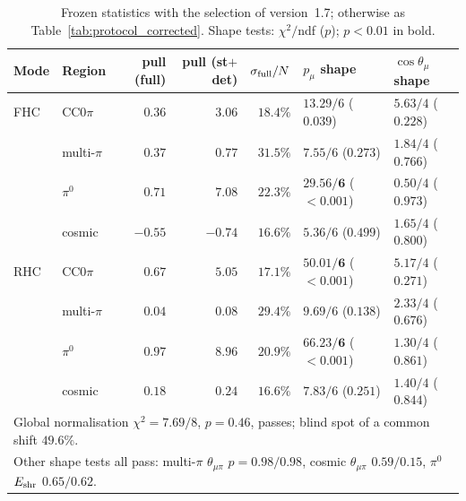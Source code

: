 \documentclass[11pt,a4paper]{article}
\begin{document}
\begin{table}[H]
  \centering
  \caption{Frozen statistics with the selection of version~1.7; otherwise as Table~\ref{tab:protocol_corrected}. Shape
    tests: $\chi^2/$ndf ($p$); $p<0.01$ in bold.}
  \label{tab:protocol_braggfix}
  \small
  \begin{tabular}{llrrr|ll}
    \toprule
    Mode & Region & pull (full) & pull (st$+$det) & $\sigma_{\rm full}/N$ & $p_\mu$ shape & $\cos\theta_\mu$ shape \\
    \midrule
    FHC & CC$0\pi$    & $0.36$ & $3.06$ & $18.4\%$ & $13.29/6$ ($0.039$) & $5.63/4$ ($0.228$) \\
        & multi-$\pi$ & $0.37$ & $0.77$ & $31.5\%$ & $7.55/6$ ($0.273$) & $1.84/4$ ($0.766$) \\
        & $\pi^0$     & $0.71$ & $7.08$ & $22.3\%$ & $\mathbf{29.56/6}$ ($\mathbf{<0.001}$) & $0.50/4$ ($0.973$) \\
        & cosmic      & $-0.55$ & $-0.74$ & $16.6\%$ & $5.36/6$ ($0.499$) & $1.65/4$ ($0.800$) \\
    \midrule
    RHC & CC$0\pi$    & $0.67$ & $5.05$ & $17.1\%$ & $\mathbf{50.01/6}$ ($\mathbf{<0.001}$) & $5.17/4$ ($0.271$) \\
        & multi-$\pi$ & $0.04$ & $0.08$ & $29.4\%$ & $9.69/6$ ($0.138$) & $2.33/4$ ($0.676$) \\
        & $\pi^0$     & $0.97$ & $8.96$ & $20.9\%$ & $\mathbf{66.23/6}$ ($\mathbf{<0.001}$) & $1.30/4$ ($0.861$) \\
        & cosmic      & $0.18$ & $0.24$ & $16.6\%$ & $7.83/6$ ($0.251$) & $1.40/4$ ($0.844$) \\
    \midrule
    \multicolumn{7}{l}{Global normalisation $\chi^2 = 7.69/8$, $p=0.46$, passes; blind spot of a common shift $49.6\%$.} \\
    \multicolumn{7}{l}{Other shape tests all pass: multi-$\pi$ $\theta_{\mu\pi}$ $p=0.98/0.98$, cosmic $\theta_{\mu\pi}$ $0.59/0.15$, $\pi^0$ $E_{\rm shr}$ $0.65/0.62$.} \\
    \bottomrule
  \end{tabular}
\end{table}
\end{document}
